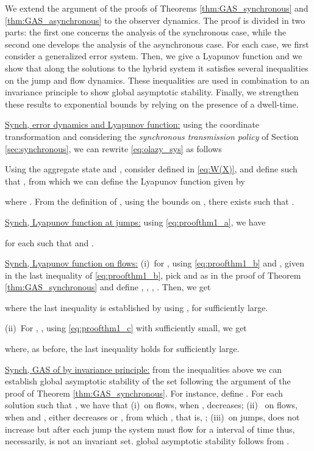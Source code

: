 \documentclass[twocolumn]{autart}
\newenvironment{proofof}{\noindent {\em Proof of }}{\hfill \hspace*{1pt}
\hfill }
\begin{document}
\begin{proofof}{\emph{Theorem \ref{thm:GASoutput}}.}
{
We extend the argument of the proofs of Theorems \ref{thm:GAS_synchronous} 
and \ref{thm:GAS_asynchronous} to the observer dynamics. The proof is 
divided in two parts: the first one concerns the analysis of the synchronous case,
while the second one develops the analysis of the asynchronous case. 
For each case, we first
consider a generalized error system. Then, we give a Lyapunov function and we
show that along the solutions to the hybrid system it satisfies several 
inequalities on the jump and flow dynamics. These
inequalities are used in combination to an invariance principle to show
global asymptotic stability. Finally, we strengthen these results to 
exponential bounds by relying on the presence of a dwell-time.}


{ \underline{Synch, error dynamics and Lyapunov function:}} 
using the coordinate transformation 
  and 
 considering the \emph{synchronous transmission policy} of Section \ref{sec:synchronous},
 we can rewrite \eqref{eq:olazy_sys} as follows 

Using the aggregate state  and 
, 
consider  defined in \eqref{eq:W(X)},
and define  such that , from which we can define the 
Lyapunov function  given by 

where .
From the definition of , using the bounds on , 
there exists  such that 
. 

{ \underline{Synch, Lyapunov function at jumps:}} 
using \eqref{eq:proofthm1_a}, we have 

for each  such that  and . 

{ \underline{Synch, Lyapunov function on flows:}} 
(i)~for , using \eqref{eq:proofthm1_b} and , 
given in the last inequality of \eqref{eq:proofthm1_b}, pick  and  as in 
the proof of Theorem \ref{thm:GAS_synchronous} and define
, 
, 
, 
.
Then, we get 

where the last inequality is established by using 
, 
for  sufficiently large.

(ii)~For , , 
using \eqref{eq:proofthm1_c} with  sufficiently small, we get

where, as before, the last inequality holds for  sufficiently large.

{ \underline{Synch, GAS of  by invariance principle:}} 
from the inequalities above we can establish global asymptotic stability of the set 
following the argument of the proof of Theorem \ref{thm:GAS_synchronous}.
For instance, define 
. 
For each solution  such that , we have that  
(i)~on flows, when  ,  decreases; 
(ii)~ on flows, when  and , either  decreases 
or , from which , that is, ; 
(iii)~on jumps,  does not increase but after each jump the system must flow for a  interval 
of time thus, necessarily,  is not an invariant set. 
global asymptotic stability follows from \cite[Theorem 23]{GoebelCSM09}.


\end{proofof}
\end{document}
